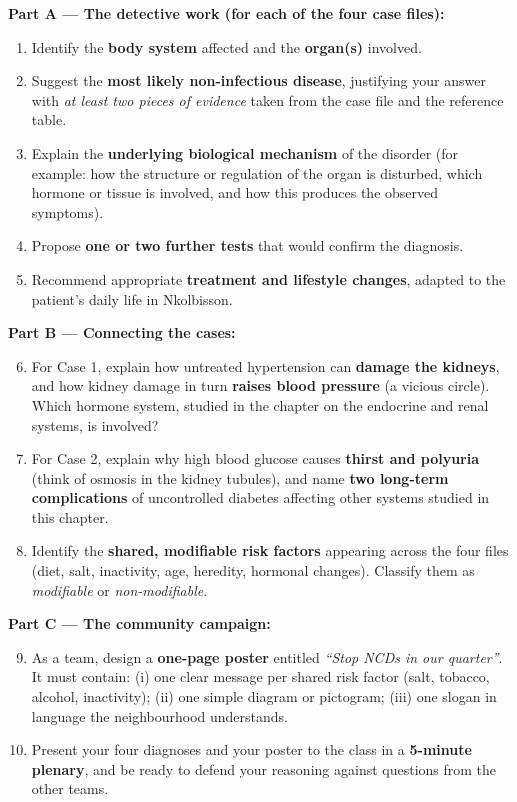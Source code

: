 \documentclass[11pt]{article}
\newcounter{popsec}
\newcounter{popsub}
\newcommand{\courssub}[1]{%
  \stepcounter{popsub}%
  \par\vspace{9pt}\noindent{\popxbold\fontsize{11.5}{13}\selectfont\color{popink}{\color{poporange}\thepopsec.\thepopsub}\hspace{6pt}#1}\par\nopagebreak\vspace{4pt}
}
\begin{document}
\courssub{Tasks}

\textbf{Part A — The detective work (for each of the four case files):}

\begin{enumerate}
\item Identify the \textbf{body system} affected and the \textbf{organ(s)} involved.
\item Suggest the \textbf{most likely non-infectious disease}, justifying your answer with \emph{at least two pieces of evidence} taken from the case file and the reference table.
\item Explain the \textbf{underlying biological mechanism} of the disorder (for example: how the structure or regulation of the organ is disturbed, which hormone or tissue is involved, and how this produces the observed symptoms).
\item Propose \textbf{one or two further tests} that would confirm the diagnosis.
\item Recommend appropriate \textbf{treatment and lifestyle changes}, adapted to the patient's daily life in Nkolbisson.
\end{enumerate}

\textbf{Part B — Connecting the cases:}

\begin{enumerate}
\setcounter{enumi}{5}
\item For Case 1, explain how untreated hypertension can \textbf{damage the kidneys}, and how kidney damage in turn \textbf{raises blood pressure} (a vicious circle). Which hormone system, studied in the chapter on the endocrine and renal systems, is involved?
\item For Case 2, explain why high blood glucose causes \textbf{thirst and polyuria} (think of osmosis in the kidney tubules), and name \textbf{two long-term complications} of uncontrolled diabetes affecting other systems studied in this chapter.
\item Identify the \textbf{shared, modifiable risk factors} appearing across the four files (diet, salt, inactivity, age, heredity, hormonal changes). Classify them as \emph{modifiable} or \emph{non-modifiable}.
\end{enumerate}

\textbf{Part C — The community campaign:}

\begin{enumerate}
\setcounter{enumi}{8}
\item As a team, design a \textbf{one-page poster} entitled \emph{``Stop NCDs in our quarter''}. It must contain: (i) one clear message per shared risk factor (salt, tobacco, alcohol, inactivity); (ii) one simple diagram or pictogram; (iii) one slogan in language the neighbourhood understands.
\item Present your four diagnoses and your poster to the class in a \textbf{5-minute plenary}, and be ready to defend your reasoning against questions from the other teams.
\end{enumerate}
\end{document}
